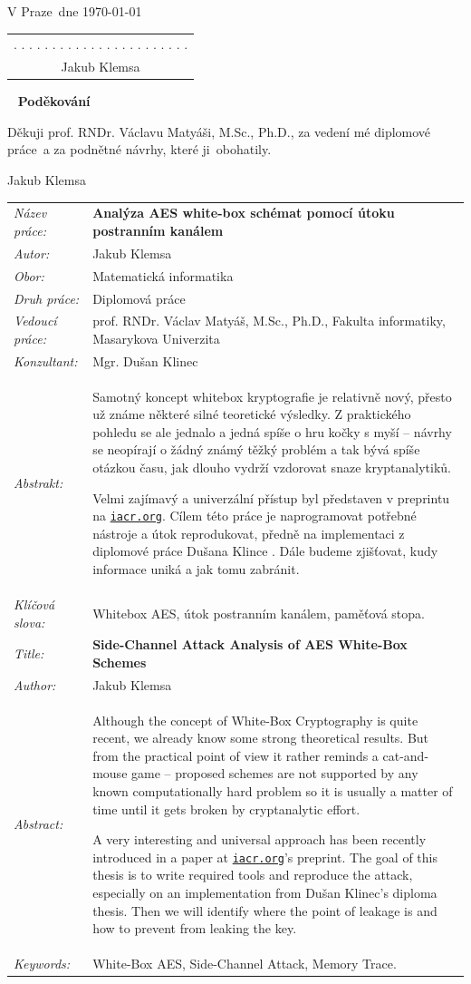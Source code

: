 \documentclass[11pt,a4paper]{report}
\theoremstyle{definition}
\theoremstyle{remark}
\newcommand{\link}[1]{\href{http://#1}{\tt #1}}
\newcommand{\obor}{Matematická informatika}
\newcommand{\TypPrace}{Diplomová práce}
\newcommand{\mePrace}{mé diplomové práce}
\newcommand{\kohoCoPraci}{ji}
\newcommand{\nazevcz}{Analýza AES white-box schémat pomocí útoku postranním kanálem}
\newcommand{\nazeven}{Side-Channel Attack Analysis of AES White-Box Schemes}
\newcommand{\autor}{Jakub Klemsa}
\newcommand{\vedouci}{prof. RNDr. Václav Matyáš, M.Sc., Ph.D.}
\newcommand{\vedoucimu}{prof. RNDr. Václavu Matyáši, M.Sc., Ph.D.}
\newcommand{\pracovisteVed}{Fakulta informatiky, Masarykova Univerzita}
\newcommand{\konzultant}{Mgr. Dušan Klinec}
\newcommand{\VMiste}{V Praze}
\newcommand{\klicova}{Whitebox AES, útok postranním kanálem, paměťová stopa.}
\newcommand{\keyword}{White-Box AES, Side-Channel Attack, Memory Trace.}
\newcommand{\abstrCZ}{Samotný koncept whitebox kryptografie je relativně nový, přesto už známe některé silné teoretické výsledky. Z praktického pohledu se ale jednalo a jedná spíše o hru kočky s myší -- návrhy se neopírají o žádný známý těžký problém a tak bývá spíše otázkou času, jak dlouho vydrží vzdorovat snaze kryptanalytiků.

Velmi zajímavý a univerzální přístup \cite{bos2015differential} byl představen v preprintu na \link{iacr.org}. Cílem této práce je naprogramovat potřebné nástroje a útok reprodukovat, předně na implementaci z diplomové práce Dušana Klince \cite{klinec2013white}. Dále budeme zjišťovat, kudy informace uniká a jak tomu zabránit.}
\newcommand{\abstrEN}{Although the concept of White-Box Cryptography is quite recent, we already know some strong theoretical results. But from the practical point of view it rather reminds a cat-and-mouse game -- proposed schemes are not supported by any known computationally hard problem so it is usually a matter of time until it gets broken by cryptanalytic effort.

A very interesting and universal approach has been recently introduced in a paper \cite{bos2015differential} at \link{iacr.org}'s preprint. The goal of this thesis is to write required tools and reproduce the attack, especially on an implementation from Dušan Klinec's diploma thesis. Then we will identify where the point of leakage is and how to prevent from leaking the key.}
\begin{document}
\begin{titlepage}
	\noindent
	\vspace{5mm}\VMiste ~dne \today\hfill
		\begin{tabular}{c}
		. . . . . . . . . . . . . . . . . . . . . . .\\
		\autor
		\end{tabular}
	\newpage
	
	
	\thispagestyle{empty}
	~
	\vfill
	\noindent\textbf{Poděkování}
	\vspace{0.5cm}
	
	\noindent
	Děkuji \vedoucimu, za vedení \mePrace ~a za podnětné návrhy, které \kohoCoPraci ~obohatily.
	
	\begin{flushright}
	\autor
	\end{flushright}
	\newpage
	
	
	\thispagestyle{empty}
	\begin{tabularx}{\textwidth}{lX}
		{\em Název práce:} & \bf \nazevcz \\[4mm]
		{\em Autor:} & \autor \\[4mm]
		{\em Obor:} & \obor \\[4mm]
		{\em Druh práce:} & \TypPrace \\[4mm]
		{\em Vedoucí práce:} & \vedouci, \pracovisteVed \\[4mm]
		{\em Konzultant:} & \konzultant \\[4mm]
		{\em Abstrakt:} & \abstrCZ \\[4mm]
		{\em Klíčová slova:} & \klicova \\[20mm]
		
		{\em Title:} & \bf \nazeven \\[4mm]
		{\em Author:} & \autor \\[4mm]
		{\em Abstract:} & \abstrEN \\[4mm]
		{\em Keywords:} & \keyword
	\end{tabularx}
	\newpage
	
	
	\thispagestyle{empty}
	\tableofcontents
	\newpage
	
	
	\thispagestyle{empty}
	\printnomenclature
	\newpage
	
\end{titlepage}



		
\end{document}

